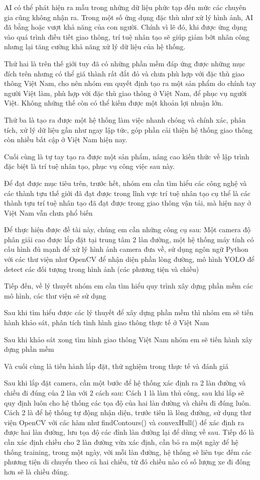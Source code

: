 \documentclass[14pt,oneside,a4paper]{extreport}
\begin{document}
AI có thể phát hiện ra mẫu trong những dữ liệu phức tạp đến mức các chuyên gia cũng không nhận ra. Trong một số ứng dụng đặc thù như xử lý hình ảnh, AI đã bằng hoặc vượt khả năng của con người. Chính vì lẽ đó, khi được ứng dụng vào quá trình điều tiết giao thông, trí tuệ nhân tạo sẽ giúp giảm bớt nhân công nhưng lại tăng cường khả năng xử lý dữ liệu của hệ thống.

Thứ hai là trên thế giới tuy đã có những phần mềm đáp ứng được những mục đích trên nhưng có thể giá thành rất đắt đỏ và chưa phù hợp với đặc thù giao thông Việt Nam, cho nên nhóm em quyết định tạo ra một sản phẩm do chính tay người Việt làm, phù hợp với đặc thù giao thông ở Việt Nam, để phục vụ người Việt. Không những thế còn có thể kiếm được một khoản lợi nhuận lớn.

Thứ ba là tạo ra được một hệ thống làm việc nhanh chóng và chính xác, phân tích, xử lý dữ liệu gần như ngay lập tức, góp phần cải thiện hệ thống giao thông còn nhiều bất cập ở Việt Nam hiện nay.

Cuối cùng là tự tay tạo ra được một sản phẩm, nâng cao kiến thức về lập trình đặc biệt là trí tuệ nhân tạo, phục vụ công việc sau này.

Để đạt được mục tiêu trên, trước hết, nhóm em cần tìm hiểu các công nghệ và các thành tựu thế giới đã đạt được trong lĩnh vực trí tuệ nhân tạo cụ thể là các thành tựu trí tuệ nhân tạo đã đạt được trong giao thông vận tải, mà hiện nay ở Việt Nam vẫn chưa phổ biến

Để thực hiện được đề tài này, chúng em cần những công cụ sau: Một camera độ phân giải cao được lắp đặt tại trung tâm 2 làn đường, một hệ thống máy tính có cấu hình đủ mạnh để xử lý hình ảnh camera đưa về, sử dụng ngôn ngữ Python với các thư viện như OpenCV để nhận diện phần lòng đường, mô hình YOLO để detect các đối tượng trong hình ảnh (các phương tiện và chiều)

Tiếp đến, về lý thuyết nhóm em cần tìm hiểu quy trình xây dựng phần mềm các mô hình, các thư viện sẽ sử dụng

Sau khi tìm hiểu được các lý thuyết để xây dựng phần mềm thì nhóm em sẽ tiến hành khảo sát, phân tích tình hình giao thông thực tế ở Việt Nam

Sau khi khảo sát xong tìm hình giao thông Việt Nam nhóm em sẽ tiến hành xây dựng phần mềm

Và cuối cùng là tiến hành lắp đặt, thử nghiệm trong thực tế và đánh giá

Sau khi lắp đặt camera, cần một bước để hệ thống xác định ra 2 làn đường và chiều đi đúng của 2 làn với 2 cách sau: Cách 1 là làm thủ công, sau khi lắp sẽ quy định luôn cho hệ thống các tọa độ của hai làn đường và chiều đi đúng luôn. Cách 2 là để hệ thống tự động nhận diện, trước tiên là lòng đường, sử dụng thư viện OpenCV với các hàm như findContours() và convexHull() để xác định ra được hai làn đường, lưu tọa độ các đỉnh làn đường lại để dùng về sau. Tiếp đó là cần xác định chiều cho 2 làn đường vừa xác định, cần bỏ ra một ngày để hệ thống training, trong một ngày, với mỗi làn đường, hệ thống sẽ liên tục đếm các phương tiện di chuyển theo cả hai chiều, từ đó chiều nào có số lượng xe đi đông hơn sẽ là chiều đúng.
\end{document}
